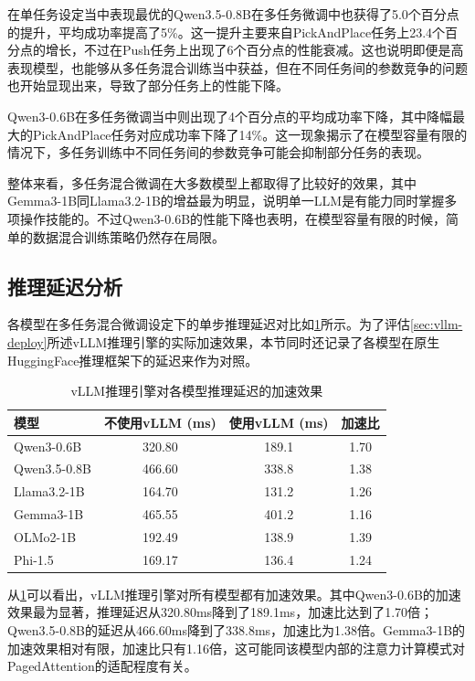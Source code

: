 在单任务设定当中表现最优的Qwen3.5-0.8B在多任务微调中也获得了5.0个百分点的提升，平均成功率提高了5\%。这一提升主要来自PickAndPlace任务上23.4个百分点的增长，不过在Push任务上出现了6个百分点的性能衰减。这也说明即便是高表现模型，也能够从多任务混合训练当中获益，但在不同任务间的参数竞争的问题也开始显现出来，导致了部分任务上的性能下降。

Qwen3-0.6B在多任务微调当中则出现了4个百分点的平均成功率下降，其中降幅最大的PickAndPlace任务对应成功率下降了14\%。这一现象揭示了在模型容量有限的情况下，多任务训练中不同任务间的参数竞争可能会抑制部分任务的表现。

整体来看，多任务混合微调在大多数模型上都取得了比较好的效果，其中Gemma3-1B同Llama3.2-1B的增益最为明显，说明单一LLM是有能力同时掌握多项操作技能的。不过Qwen3-0.6B的性能下降也表明，在模型容量有限的时候，简单的数据混合训练策略仍然存在局限。

\subsection{推理延迟分析}
各模型在多任务混合微调设定下的单步推理延迟对比如\cref{tab:latency-vllm}所示。为了评估\cref{sec:vllm-deploy}所述vLLM推理引擎的实际加速效果，本节同时还记录了各模型在原生HuggingFace推理框架下的延迟来作为对照。

\begin{table}[htbp]
  \centering
  \caption{vLLM推理引擎对各模型推理延迟的加速效果}\label{tab:latency-vllm}
  \small
  \begin{tabular}{lccc}
    \toprule
    模型 & 不使用vLLM (ms) & 使用vLLM (ms) & 加速比 \\
    \midrule
    Qwen3-0.6B & 320.80 & 189.1 & 1.70 \\
    Qwen3.5-0.8B & 466.60 & 338.8 & 1.38 \\
    Llama3.2-1B & 164.70 & 131.2 & 1.26 \\
    Gemma3-1B & 465.55 & 401.2 & 1.16 \\
    OLMo2-1B & 192.49 & 138.9 & 1.39 \\
    Phi-1.5 & 169.17 & 136.4 & 1.24 \\
    \bottomrule
  \end{tabular}
\end{table}

从\cref{tab:latency-vllm}可以看出，vLLM推理引擎对所有模型都有加速效果。其中Qwen3-0.6B的加速效果最为显著，推理延迟从320.80ms降到了189.1ms，加速比达到了1.70倍；Qwen3.5-0.8B的延迟从466.60ms降到了338.8ms，加速比为1.38倍。Gemma3-1B的加速效果相对有限，加速比只有1.16倍，这可能同该模型内部的注意力计算模式对PagedAttention的适配程度有关。

